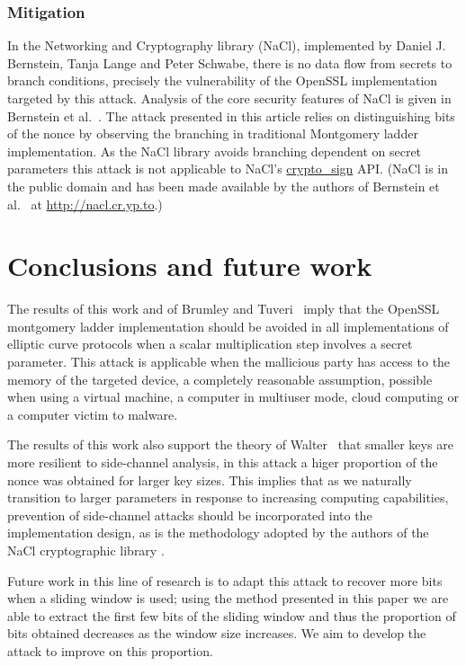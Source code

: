 \documentclass[twocolumn]{svjour3}
\begin{document}
\subsubsection*{Mitigation}

In the Networking and Cryptography library (NaCl), implemented by Daniel J. Bernstein, Tanja Lange and Peter Schwabe, there is no data flow from secrets to branch conditions, precisely the vulnerability of the OpenSSL implementation targeted by this attack. Analysis of the core security features of NaCl is given in Bernstein et al.~\cite{dan-tan-peter}. The attack presented in this article relies on distinguishing bits of the nonce by observing the branching in traditional Montgomery ladder implementation. As the NaCl library avoids branching dependent on secret parameters this attack is not applicable to NaCl's \url{crypto_sign} API. (NaCl is in the public domain and has been made available by the authors of Bernstein et al.~\cite{dan-tan-peter} at \url{http://nacl.cr.yp.to}.)


\section{Conclusions and future work}
The results of this work and of Brumley and Tuveri~\cite{brumley11remote} imply that the OpenSSL montgomery ladder implementation should be avoided in all implementations of elliptic curve protocols when a scalar multiplication step involves a secret parameter. This attack is applicable when the mallicious party has access to the memory of the targeted device, a completely reasonable assumption, possible when using a virtual machine, a computer in multiuser mode, cloud computing or a computer victim to malware. 

The results of this work also support the theory of Walter~\cite{walter04longer} that smaller keys are more resilient to side-channel analysis, in this attack a higer proportion of the nonce was obtained for larger key sizes. This implies that as we naturally transition to larger parameters in response to increasing computing capabilities, prevention of side-channel attacks should be incorporated into the implementation design, as is the methodology adopted by the authors of the NaCl cryptographic library \cite{dan-tan-peter}. 

Future work in this line of research is to adapt this attack to recover more bits when a sliding window is used; using the method presented in this paper we are able to extract the first few bits of the sliding window and thus the proportion of bits obtained decreases as the window size increases. We aim to develop the attack to improve on this proportion. 
\end{document}
